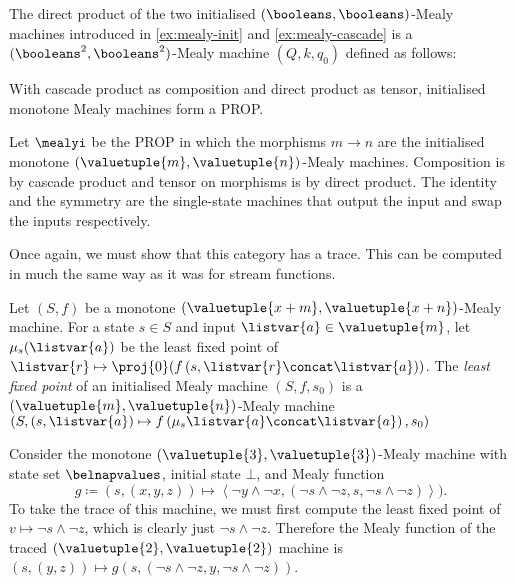 \documentclass{lmcs}
\begin{document}
\begin{exa}\label{ex:mealy-direct}
    The direct product of the two initialised \((\booleans,\booleans)\)-Mealy
    machines introduced in \autoref{ex:mealy-init} and \autoref{ex:mealy-cascade} is
    a \((\booleans^2,\booleans^2)\)-Mealy machine \((Q,k,q_0)\) defined as
    follows:
    \begin{center}
        
    \end{center}
\end{exa}

With cascade product as composition and direct product as tensor, initialised
monotone Mealy machines form a PROP.

\begin{defi}
    Let \(\mealyi\) be the PROP in which the morphisms
    \(m \to n\) are the initialised monotone
    \((\valuetuple{m}, \valuetuple{n})\)-Mealy machines.
    Composition is by cascade product and tensor on morphisms is by
    direct product.
    The identity and the symmetry are the single-state machines that output the
    input and swap the inputs respectively.
\end{defi}

Once again, we must show that this category has a trace.
This can be computed in much the same way as it was for stream functions.

\begin{defi}
    Let \((S, f)\) be a monotone \(
    (\valuetuple{x+m}, \valuetuple{x+n})
    \)-Mealy machine.
    For a state \(s \in S\) and input \(\listvar{a} \in \valuetuple{m}\), let
    \(\mu_{s}(\listvar{a})\) be the least fixed point of \(
    \listvar{r} \mapsto \proj{0}\mleft(f\left(s, \listvar{r} \concat \listvar{a}\right)\mright)
    \).
    The \emph{least fixed point} of an initialised Mealy machine \((S, f, s_0)\)
    is a \((\valuetuple{m}, \valuetuple{n})\)-Mealy machine \(\left(
    S, (s, \listvar{a})
    \mapsto
    f\left(\mu_{s}\listvar{a} \concat \listvar{a}\right), s_0
    \right)
    \)
\end{defi}

\begin{exa}\label{ex:trace-mealy}
    Consider the monotone \((\valuetuple{3},\valuetuple{3})\)-Mealy machine with
    state set \(\belnapvalues\), initial state \(\bot\), and Mealy function \[
        g \coloneqq (s, (x, y, z))
        \mapsto \left\langle \neg y \land \neg x,
        \left(\neg s \land \neg z, s, \neg s \land \neg z\right)
        \right\rangle
        ).\]
    To take the trace of this machine, we must first compute the least fixed
    point of \(v \mapsto \neg s \land \neg z\), which is clearly just
    \(\neg s \land \neg z\).
    Therefore the Mealy function of the traced
    \((\valuetuple{2}, \valuetuple{2})\) machine is \(
    (s, (y, z)) \mapsto g(s, (\neg s \land \neg z, y, \neg s \land \neg z))
    \).
\end{exa}
\end{document}
